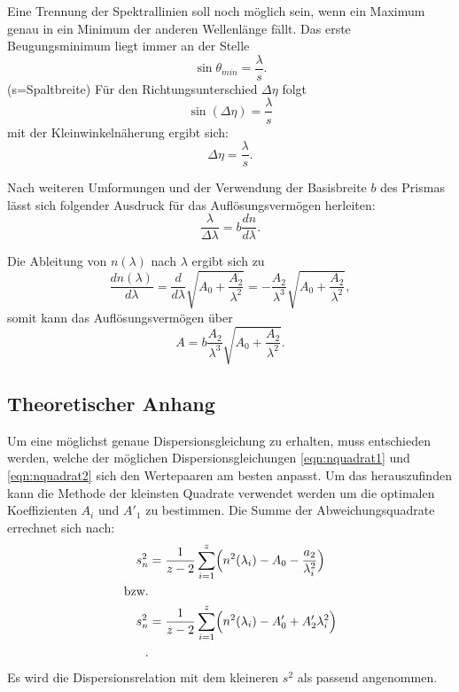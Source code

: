 Eine Trennung der Spektrallinien soll noch möglich sein, wenn ein Maximum
genau in ein Minimum der anderen Wellenlänge fällt.
Das erste Beugungsminimum liegt immer an der Stelle
\begin{equation}
  \sin{\theta_{min}}=\frac{\lambda}{s}.
\end{equation}
(s=Spaltbreite)
Für den Richtungsunterschied $\Delta\eta$ folgt
\begin{equation}
  \sin({\Delta\eta})=\frac{\lambda}{s}
  \label{sineta}
\end{equation}
mit der Kleinwinkelnäherung ergibt sich:
\begin{equation}
  \Delta \eta =\frac{\lambda}{s}.
  \label{deltaeta}
\end{equation}

Nach weiteren Umformungen und der Verwendung der Basisbreite $b$ des
Prismas lässt sich folgender Ausdruck für das Auflösungsvermögen
herleiten:
\begin{equation}
  \frac{\lambda}{\Delta \lambda}=b\frac{dn}{d\lambda}.
  \label{eqn:auflösungsvermögen}
\end{equation}

Die Ableitung von $n(\lambda)$ nach $\lambda$ ergibt sich zu
\begin{equation}
  \frac{dn(\lambda)}{d\lambda}=\frac{d}{d\lambda}\sqrt{A_0+\frac{A_2}{\lambda^2}}
  =-\frac{A_2}{\lambda^3}\sqrt{A_0+\frac{A_2}{\lambda^2}},
\end{equation}
somit kann das Auflösungsvermögen über
\begin{equation}
  A=b\frac{A_2}{\lambda^3}{\sqrt{A_0+\frac{A_2}{\lambda^2}}}.
  \label{eqn:auflösungsver}
\end{equation}

\subsection{Theoretischer Anhang}
Um eine möglichst genaue Dispersionsgleichung zu erhalten, muss
entschieden werden, welche der möglichen Dispersionsgleichungen
\ref{eqn:nquadrat1} und \ref{eqn:nquadrat2} sich den Wertepaaren
am besten anpasst. Um das herauszufinden kann die Methode der
kleinsten Quadrate verwendet werden um die optimalen Koeffizienten
$A_i$ und $A'_1$ zu bestimmen.
Die Summe der Abweichungsquadrate errechnet sich nach:
\begin{align}
  s_{n}^{2}&=\frac{1}{z-2}\sum_{i=1}^{z} \Bigl(n^2(\lambda_i)-A_0-\frac{a_2}{\lambda_{i}^{2}}\Bigr) \\
  \text{bzw.}\\
  s_{n}^{2}&=\frac{1}{z-2}\sum_{i=1}^{z} \Bigl(n^2(\lambda_i)-A'_0+A'_{2}\lambda_{i}^{2}\Bigr) \\.
  \label{abweichungquadrat}
\end{align}
Es wird die Dispersionsrelation mit dem kleineren $s^2$ als passend angenommen.

